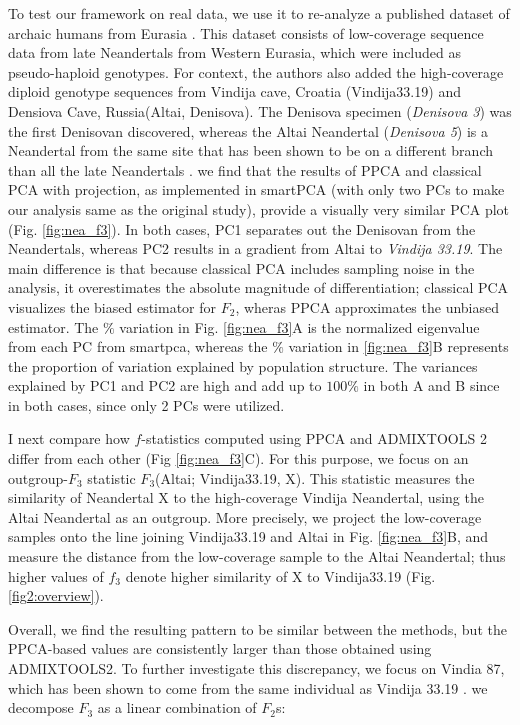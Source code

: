 \documentclass[12pt]{article}
\begin{document}
To test our framework on real data, we use it to re-analyze a published dataset of archaic humans from Eurasia \citep{hajdinjak_reconstructing_2018}. This dataset consists of low-coverage sequence data from late Neandertals from Western Eurasia, which were included as pseudo-haploid genotypes. For context, the authors also added the high-coverage diploid genotype sequences from Vindija cave, Croatia (Vindija33.19)\citep{prufer_high-coverage_2017} and Densiova Cave, Russia(Altai, Denisova)\citep{prufer_complete_2014, meyer_high-coverage_2012}. The Denisova specimen (\textit{Denisova 3}) was the first Denisovan discovered, whereas the Altai Neandertal (\textit{Denisova 5}) is a Neandertal from the same site that has been shown to be on a different branch than all the late Neandertals \citep{prufer_complete_2014, prufer_high-coverage_2017}. we find that the results of PPCA and classical PCA with projection, as implemented in smartPCA (with only two PCs to make our analysis same as the original study), provide a visually very similar PCA plot (Fig. \ref{fig:nea_f3}). In both cases, PC1 separates out the Denisovan from the Neandertals, whereas PC2 results in a gradient from Altai to \textit{Vindija 33.19}. 
The main difference is that because classical PCA includes sampling noise in the analysis, it overestimates the absolute magnitude of differentiation; classical PCA visualizes the biased estimator for $F_2$, wheras PPCA approximates the unbiased estimator. The $\%$ variation in Fig. \ref{fig:nea_f3}A is the normalized eigenvalue from each PC from smartpca, whereas the $\%$ variation in \ref{fig:nea_f3}B represents the proportion of variation explained by population structure. The variances explained by PC1 and PC2 are high and add up to $100\%$ in both A and B since in both cases, since only 2 PCs were utilized.

I next compare how $f$-statistics computed using PPCA and ADMIXTOOLS 2 differ from each other (Fig \ref{fig:nea_f3}C). For this purpose, we focus on an outgroup-$F_3$ statistic $F_3$(Altai; Vindija33.19, X). This statistic measures the similarity of Neandertal X to the high-coverage Vindija Neandertal, using the Altai Neandertal as an outgroup. More precisely, we project the low-coverage samples onto the line joining Vindija33.19 and Altai in Fig. \ref{fig:nea_f3}B, and measure the distance from the low-coverage sample to the Altai Neandertal; thus higher values of $f_3$ denote higher similarity of X to Vindija33.19 (Fig. \ref{fig2:overview}). 

Overall, we find the resulting pattern to be similar between the methods, but the PPCA-based values are consistently larger than those obtained using ADMIXTOOLS2. To further investigate this discrepancy, we focus on Vindia 87, which has been shown to come from the same individual as Vindija 33.19 \citep{hajdinjak_reconstructing_2018}. we decompose  $F_3$ as a linear combination of $F_2$s:
\end{document}
